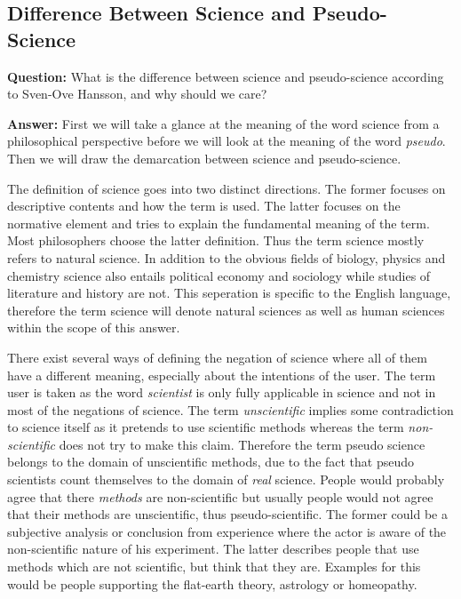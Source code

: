 \documentclass[11pt]{scrartcl}
\begin{document}
\subsection{Difference Between Science and Pseudo-Science}

\textbf{Question:} What is the difference between science and pseudo-science according to Sven-Ove Hansson, and why should we care?

\bigbreak

\textbf{Answer:} First we will take a glance at the meaning of the word science from a philosophical perspective before we will look at the meaning of the word \textit{pseudo}. Then we will draw the demarcation between science and pseudo-science.

The definition of science goes into two distinct directions. The former focuses on descriptive contents and how the term is used. The latter focuses on the normative element and tries to explain the fundamental meaning of the term. Most philosophers choose the latter definition. Thus the term science mostly refers to natural science. In addition to the obvious fields of biology, physics and chemistry science also entails political economy and sociology while studies of literature and history are not. This seperation is specific to the English language, therefore the term science will denote natural sciences as well as human sciences within the scope of this answer.

There exist several ways of defining the negation of science where all of them have a different meaning, especially about the intentions of the user. The term user is taken as the word \textit{scientist} is only fully applicable in science and not in most of the negations of science. The term \textit{unscientific} implies some contradiction to science itself as it pretends to use scientific methods whereas the term \textit{non-scientific} does not try to make this claim. Therefore the term pseudo science belongs to the domain of unscientific methods, due to the fact that pseudo scientists count themselves to the domain of \textit{real} science. People would probably agree that there \textit{methods} are non-scientific but usually people would not agree that their methods are unscientific, thus pseudo-scientific. The former could be a subjective analysis or conclusion from experience where the actor is aware of the non-scientific nature of his experiment. The latter describes people that use methods which are not scientific, but think that they are. Examples for this would be people supporting the flat-earth theory, astrology or homeopathy.
\end{document}
